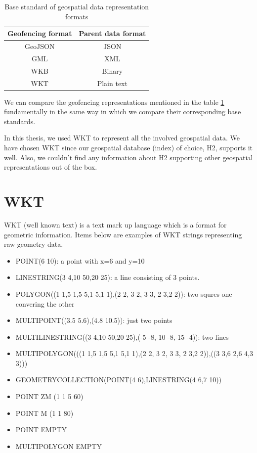 \documentclass[a4]{report}
\begin{document}
    \begin{table}[h!]
        \centering
        \begin{tabular}{|c|c|}
            \hline
            Geofencing format & Parent data format \\
            \hline
            GeoJSON           & JSON               \\
            GML               & XML                \\
            WKB               & Binary             \\
            WKT               & Plain text         \\
            \hline
        \end{tabular}
        \caption{Base standard of geospatial data representation formats}
        \label{table:geofencing-formats}
    \end{table}

    We can compare the geofencing representations mentioned in the table \ref{table:geofencing-formats} fundamentally
    in the same way in which we compare their corresponding base standards.

    In this thesis, we used WKT to represent all the involved geospatial data.
    We have chosen WKT since our geospatial database (index) of choice, H2\cite{h2}, supports it well.
    Also, we couldn't find any information about H2 supporting other geospatial representations out of the box.


    \section{WKT}
    WKT (well known text) is a text mark up language which is a format for geometric information.
    Items below are examples of WKT strings representing raw geometry data.
    \begin{itemize}
        \item POINT(6 10): a point with x=6 and y=10
        \item LINESTRING(3 4,10 50,20 25): a line consisting of 3 points.
        \item POLYGON((1 1,5 1,5 5,1 5,1 1),(2 2, 3 2, 3 3, 2 3,2 2)): two squres one convering the other
        \item MULTIPOINT((3.5 5.6),(4.8 10.5)): just two points
        \item MULTILINESTRING((3 4,10 50,20 25),(-5 -8,-10 -8,-15 -4)): two lines
        \item MULTIPOLYGON(((1 1,5 1,5 5,1 5,1 1),(2 2, 3 2, 3 3, 2 3,2 2)),((3 3,6 2,6 4,3 3)))
        \item GEOMETRYCOLLECTION(POINT(4 6),LINESTRING(4 6,7 10))
        \item POINT ZM (1 1 5 60)
        \item POINT M (1 1 80)
        \item POINT EMPTY
        \item MULTIPOLYGON EMPTY
    \end{itemize}
\end{document}
